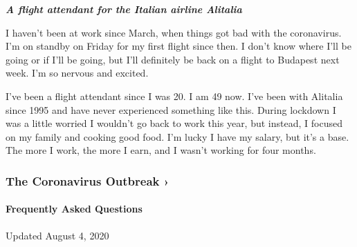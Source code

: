 \emph{\textbf{A flight attendant for the Italian airline Alitalia}}

I haven't been at work since March, when things got bad with the
coronavirus. I'm on standby on Friday for my first flight since then. I
don't know where I'll be going or if I'll be going, but I'll definitely
be back on a flight to Budapest next week. I'm so nervous and excited.

I've been a flight attendant since I was 20. I am 49 now. I've been with
Alitalia since 1995 and have never experienced something like this.
During lockdown I was a little worried I wouldn't go back to work this
year, but instead, I focused on my family and cooking good food. I'm
lucky I have my salary, but it's a base. The more I work, the more I
earn, and I wasn't working for four months.

\href{https://www.nytimes.com/news-event/coronavirus?action=click\&pgtype=Article\&state=default\&region=MAIN_CONTENT_3\&context=storylines_faq}{}

\hypertarget{the-coronavirus-outbreak-}{%
\subsubsection{The Coronavirus Outbreak
›}\label{the-coronavirus-outbreak-}}

\hypertarget{frequently-asked-questions}{%
\paragraph{Frequently Asked
Questions}\label{frequently-asked-questions}}

Updated August 4, 2020

